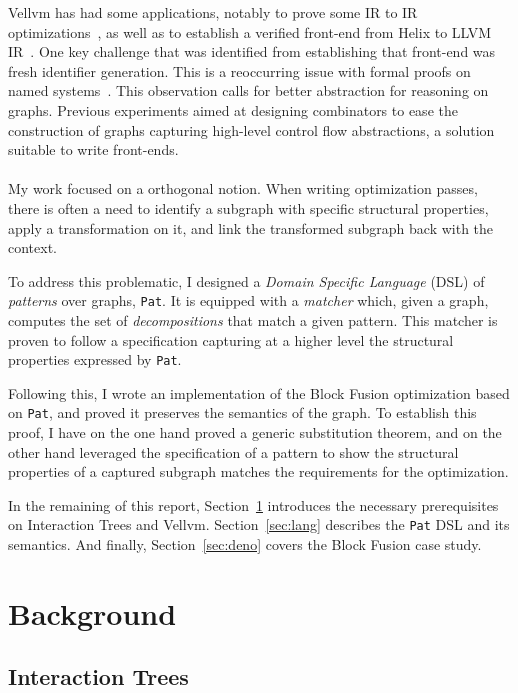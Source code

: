 \documentclass[11pt]{article}
\newcommand{\pat}{\texttt{Pat}\xspace}
\begin{document}
Vellvm has had some applications, notably to prove some IR to IR optimizations~\cite{?}, as well as to establish a verified front-end from Helix to LLVM IR~\cite{?}. One key challenge that was identified from establishing that front-end was fresh identifier generation. This is a reoccurring issue with formal proofs on named systems~\cite{?}. This observation calls for better abstraction for reasoning on graphs. Previous experiments aimed at designing combinators to ease the construction of graphs capturing high-level control flow abstractions, a solution suitable to write front-ends.

\paragraph{}
My work focused on a orthogonal notion. When writing optimization passes, there is often a need to identify a subgraph with specific structural properties, apply a transformation on it, and link the transformed subgraph back with the context.

To address this problematic, I designed a \emph{Domain Specific Language} (DSL) of \emph{patterns} over graphs, \pat{}. It is equipped with a \emph{matcher} which, given a graph, computes the set of \emph{decompositions} that match a given pattern. This matcher is proven to follow a specification capturing at a higher level the structural properties expressed by \pat{}.

Following this, I wrote an implementation of the Block Fusion optimization based on \pat{}, and proved it preserves the semantics of the graph. To establish this proof, I have on the one hand proved a generic substitution theorem, and on the other hand leveraged the specification of a pattern to show the structural properties of a captured subgraph matches the requirements for the optimization.

In the remaining of this report, Section~\ref{sec:background} introduces the necessary prerequisites on Interaction Trees and Vellvm. Section~\ref{sec:lang} describes the \pat{} DSL and its semantics. And finally, Section~\ref{sec:deno} covers the Block Fusion case study.

\section{Background}
\label{sec:background}

\subsection{Interaction Trees}
\end{document}
